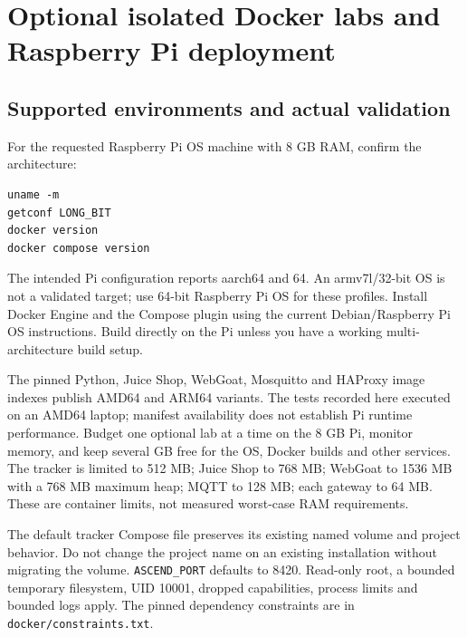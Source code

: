 \section{Optional isolated Docker labs and Raspberry Pi deployment}
\subsection{Supported environments and actual validation}
For the requested Raspberry Pi OS machine with 8 GB RAM, confirm the architecture:
\begin{verbatim}
uname -m
getconf LONG_BIT
docker version
docker compose version
\end{verbatim}
The intended Pi configuration reports aarch64 and 64. An armv7l/32-bit OS is not a
validated target; use 64-bit Raspberry Pi OS for these profiles. Install Docker
Engine and the Compose plugin using the current Debian/Raspberry Pi OS instructions.
Build directly on the Pi unless you have a working multi-architecture build setup.

The pinned Python, Juice Shop, WebGoat, Mosquitto and HAProxy image indexes publish
AMD64 and ARM64 variants. The tests recorded here executed on an AMD64 laptop;
manifest availability does not establish Pi runtime performance. Budget one optional
lab at a time on the 8 GB Pi, monitor memory, and keep several GB free for the OS,
Docker builds and other services. The tracker is limited to 512 MB; Juice Shop to
768 MB; WebGoat to 1536 MB with a 768 MB maximum heap; MQTT to 128 MB; each gateway
to 64 MB. These are container limits, not measured worst-case RAM requirements.

The default tracker Compose file preserves its existing named volume and project
behavior. Do not change the project name on an existing installation without migrating
the volume. \texttt{ASCEND\_PORT} defaults to 8420. Read-only root, a bounded temporary
filesystem, UID 10001, dropped capabilities, process limits and bounded logs apply.
The pinned dependency constraints are in \texttt{docker/constraints.txt}.

